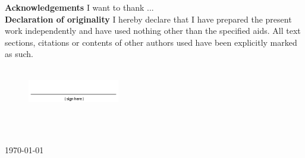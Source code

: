 
\vspace*{\fill}


\noindent\textbf{Acknowledgements} I want to thank ... \\


\noindent\textbf{Declaration of originality} I hereby declare that I have prepared the present work independently and have used nothing other than the specified aids. All text sections, citations or contents of other authors used have been explicitly marked as such.\\

\,

\begin{figure}[H]
    \centering
    \includegraphics[width=4cm]{img/sign.png}
\end{figure}

\,

\begin{center}
\authorcity\\
\today\\
\authorname
\end{center}
